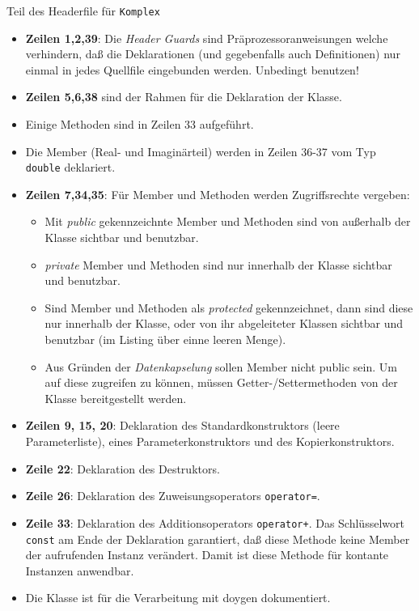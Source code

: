 {Teil des Headerfile für \texttt{Komplex}}
%
\begin{itemize}
    \item \textbf{Zeilen 1,2,39}: Die \emph{Header Guards} sind Präprozessoranweisungen
   welche verhindern, daß die Deklarationen (und gegebenfalls auch Definitionen) nur einmal
   in jedes Quellfile eingebunden werden. Unbedingt benutzen!
   \item \textbf{Zeilen 5,6,38} sind der Rahmen für die Deklaration der Klasse.
   \item Einige Methoden sind in Zeilen 33 aufgeführt.
   \item Die Member (Real- und Imaginärteil) werden in Zeilen 36-37 vom Typ \texttt{double} deklariert.
   \item \textbf{Zeilen 7,34,35}: Für Member und Methoden werden Zugriffsrechte vergeben:
   \begin{itemize}
      \item Mit \emph{public} gekennzeichnte Member und Methoden sind von außerhalb der Klasse sichtbar und benutzbar.
      \item  \emph{private} Member und Methoden sind nur innerhalb der Klasse sichtbar und benutzbar.
      \item Sind Member und Methoden als \emph{protected} gekennzeichnet, dann sind diese nur innerhalb der Klasse, oder von ihr abgeleiteter Klassen sichtbar und benutzbar (im Listing über einne leeren Menge).
      \item Aus Gründen der \emph{Datenkapselung} sollen Member nicht public sein. Um auf diese
       zugreifen zu können, müssen Getter-/Settermethoden von der Klasse bereitgestellt werden.
   \end{itemize}
   \item \textbf{Zeilen 9, 15, 20}: Deklaration des Standardkonstruktors (leere Parameterliste),
     eines Parameterkonstruktors und des Kopierkonstruktors.
   \item \textbf{Zeile 22}: Deklaration des Destruktors.
   \item \textbf{Zeile 26}: Deklaration des Zuweisungsoperators \texttt{operator=}\;.
   \item \textbf{Zeile 33}: Deklaration des Additionsoperators \texttt{operator+}\;.
     Das Schlüsselwort \texttt{const} am Ende der Deklaration garantiert, daß diese Methode
     keine Member der aufrufenden Instanz verändert. Damit ist diese Methode für kontante
     Instanzen anwendbar.
   \item Die Klasse ist für die Verarbeitung mit doygen dokumentiert.
\end{itemize}

